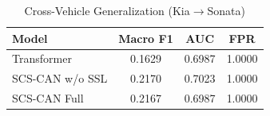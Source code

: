 \begin{table}[t]
\centering
\caption{Cross-Vehicle Generalization (Kia$\rightarrow$Sonata)}
\label{tab:crossvehicle}
\small
\begin{tabular}{lccc}
\toprule
Model & Macro F1 & AUC & FPR \\
\midrule
Transformer & 0.1629 & 0.6987 & 1.0000 \\
SCS-CAN w/o SSL & 0.2170 & 0.7023 & 1.0000 \\
SCS-CAN Full & 0.2167 & 0.6987 & 1.0000 \\
\bottomrule
\end{tabular}
\end{table}
